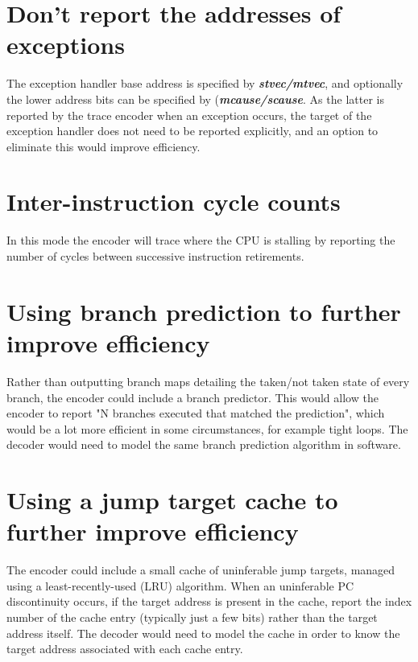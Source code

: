 \section{Don't report the addresses of exceptions}

The exception handler base address is specified by \textbf{\textit{stvec/mtvec}}, and 
optionally the lower address bits can be specified by (\textbf{\textit{mcause/scause}}.
As the latter is reported by the trace encoder when an exception occurs, the target
of the exception handler does not need to be reported explicitly, and an option to 
eliminate this would improve efficiency.

\section{Inter-instruction cycle counts}

In this mode the encoder will trace where the CPU is stalling by
reporting the number of cycles between successive instruction
retirements.

\section{Using branch prediction to further improve efficiency}

Rather than outputting branch maps detailing the taken/not taken state of every branch,
the encoder could include a branch predictor.  This would allow the encoder to 
report "N branches executed that matched the prediction", which would be a lot more
efficient in some circumstances, for example tight loops.  The decoder would need to 
model the same branch prediction algorithm in software.

\section{Using a jump target cache to further improve efficiency}

The encoder could include a small cache of uninferable jump targets, managed using a
least-recently-used (LRU) algorithm.  When an uninferable PC discontinuity occurs, if 
the target address is present in the cache, report the index number of the cache
entry (typically just a few bits) rather than the target address itself.  The decoder 
would need to model the cache in order to know the target address associated with
each cache entry.


